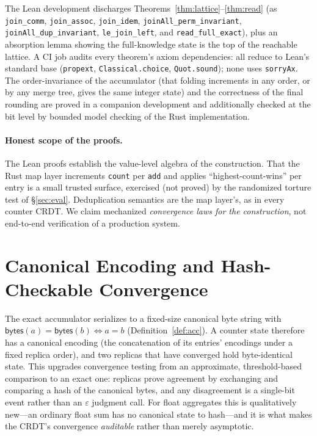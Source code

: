 \documentclass[11pt]{article}
\begin{document}
The Lean development discharges Theorems~\ref{thm:lattice}--\ref{thm:read} (as
\texttt{join\_comm}, \texttt{join\_assoc}, \texttt{join\_idem}, \texttt{joinAll\_perm\_invariant},
\texttt{joinAll\_dup\_invariant}, \texttt{le\_join\_left}, and \texttt{read\_full\_exact}), plus an
absorption lemma showing the full-knowledge state is the top of the reachable lattice. A CI job audits
every theorem's axiom dependencies: all reduce to Lean's standard base (\texttt{propext},
\texttt{Classical.choice}, \texttt{Quot.sound}); none uses \texttt{sorryAx}. The order-invariance of the
accumulator (that folding increments in any order, or by any merge tree, gives the same integer state)
and the correctness of the final rounding are proved in a companion development and additionally checked
at the bit level by bounded model checking of the Rust implementation.

\paragraph{Honest scope of the proofs.} The Lean proofs establish the value-level algebra of the
construction. That the Rust map layer increments \texttt{count} per \texttt{add} and applies
``highest-count-wins'' per entry is a small trusted surface, exercised (not proved) by the randomized
torture test of \S\ref{sec:eval}. Deduplication semantics are the map layer's, as in every counter CRDT.
We claim mechanized \emph{convergence laws for the construction}, not end-to-end verification of a
production system.

\section{Canonical Encoding and Hash-Checkable Convergence}\label{sec:encoding}

The exact accumulator serializes to a fixed-size canonical byte string with
$\mathsf{bytes}(a)=\mathsf{bytes}(b)\iff a=b$ (Definition~\ref{def:acc}). A counter state therefore has
a canonical encoding (the concatenation of its entries' encodings under a fixed replica order), and two
replicas that have converged hold byte-identical state. This upgrades convergence testing from an
approximate, threshold-based comparison to an exact one: replicas prove agreement by exchanging and
comparing a hash of the canonical bytes, and any disagreement is a single-bit event rather than an
$\varepsilon$ judgment call. For float aggregates this is qualitatively new---an ordinary float sum has
no canonical state to hash---and it is what makes the CRDT's convergence \emph{auditable} rather than
merely asymptotic.
\end{document}
